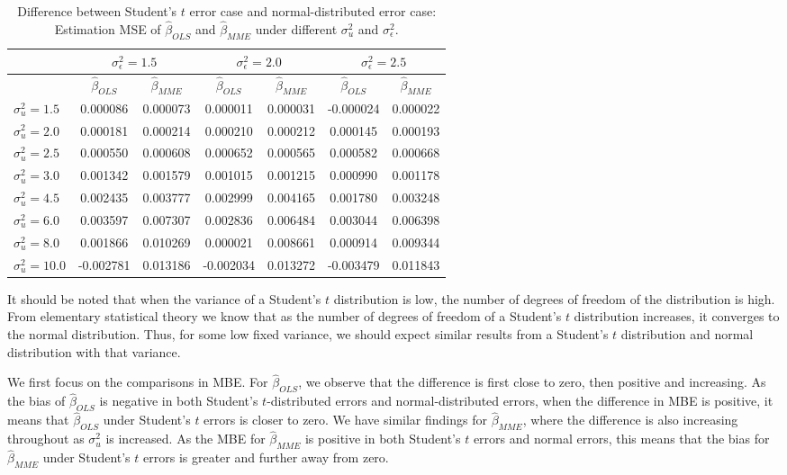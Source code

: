 \documentclass{article}
\begin{document}
\begin{table}[ht]
    \centering
    \caption{Difference between Student's $t$ error case and normal-distributed error case: Estimation MSE of $\hat{\beta}_{OLS}$ and $\hat{\beta}_{MME}$ under different $\sigma^2_u$ and $\sigma^2_\epsilon$.}
    \label{Tab:MSE_diff_t_normal}
    \begin{tabular}[t]{lcccccc}
        \hline
        &\multicolumn{2}{c}{$\sigma^2_\epsilon=1.5$}&\multicolumn{2}{c}{$\sigma^2_\epsilon=2.0$}&\multicolumn{2}{c}{$\sigma^2_\epsilon=2.5$}\\
        \hline
        &$\hat{\beta}_{OLS}$&$\hat{\beta}_{MME}$&$\hat{\beta}_{OLS}$&$\hat{\beta}_{MME}$&$\hat{\beta}_{OLS}$&$\hat{\beta}_{MME}$\\
        \hline
        $\sigma^2_u = 1.5$&0.000086&0.000073&0.000011&0.000031&-0.000024&0.000022\\
        $\sigma^2_u = 2.0$&0.000181&0.000214&0.000210&0.000212&0.000145&0.000193\\
        $\sigma^2_u = 2.5$&0.000550&0.000608&0.000652&0.000565&0.000582&0.000668\\
        $\sigma^2_u = 3.0$&0.001342&0.001579&0.001015&0.001215&0.000990&0.001178\\
        $\sigma^2_u = 4.5$&0.002435&0.003777&0.002999&0.004165&0.001780&0.003248\\
        $\sigma^2_u = 6.0$&0.003597&0.007307&0.002836&0.006484&0.003044&0.006398\\
        $\sigma^2_u = 8.0$&0.001866&0.010269&0.000021&0.008661&0.000914&0.009344\\
        $\sigma^2_u = 10.0$&-0.002781&0.013186&-0.002034&0.013272&-0.003479&0.011843\\
        \hline
    \end{tabular}
\end{table}

It should be noted that when the variance of a Student's $t$ distribution is low, the number of degrees of freedom of the distribution is high. 
From elementary statistical theory we know that as the number of degrees of freedom of a Student's $t$ distribution increases, it converges to the normal distribution.
Thus, for some low fixed variance, we should expect similar results from a Student's $t$ distribution and normal distribution with that variance.

We first focus on the comparisons in MBE.
For $\hat{\beta}_{OLS}$, we observe that the difference is first close to zero, then positive and increasing.
As the bias of $\hat{\beta}_{OLS}$ is negative in both Student's $t$-distributed errors and normal-distributed errors,
when the difference in MBE is positive, it means that $\hat{\beta}_{OLS}$ under Student's $t$ errors is closer to zero.
We have similar findings for $\hat{\beta}_{MME}$, where the difference is also increasing throughout as $\sigma^2_u$ is increased.
As the MBE for $\hat{\beta}_{MME}$ is positive in both Student's $t$ errors and normal errors, this means that the bias for $\hat{\beta}_{MME}$ under Student's $t$ errors is greater and further away from zero.
\end{document}
